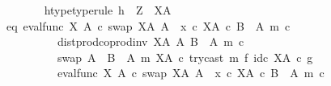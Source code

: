 \begin{isabellebody}
\ \ \ \ \ \ \isamarkupfalse%
\ h{\isacharunderscore}{\kern0pt}type{\isacharbrackleft}{\kern0pt}type{\isacharunderscore}{\kern0pt}rule{\isacharbrackright}{\kern0pt}{\isacharcolon}{\kern0pt}\ {\isachardoublequoteopen}h\ {\isacharcolon}{\kern0pt}\ Z\ {\isasymrightarrow}\ X\isactrlbsup A\isactrlesup {\isachardoublequoteclose}\isanewline
\ \ \ \ \ \ \isamarkupfalse%
\ eq{\isacharcolon}{\kern0pt}\ {\isachardoublequoteopen}{\isacharparenleft}{\kern0pt}{\isacharparenleft}{\kern0pt}eval{\isacharunderscore}{\kern0pt}func\ X\ A\ {\isasymcirc}\isactrlsub c\ swap\ {\isacharparenleft}{\kern0pt}X\isactrlbsup A\isactrlesup {\isacharparenright}{\kern0pt}\ A{\isacharparenright}{\kern0pt}\ {\isasymamalg}\ {\isacharparenleft}{\kern0pt}x\ {\isasymcirc}\isactrlsub c\ {\isasymbeta}\isactrlbsub X\isactrlbsup A\isactrlesup \ {\isasymtimes}\isactrlsub c\ {\isacharparenleft}{\kern0pt}B\ {\isasymsetminus}\ {\isacharparenleft}{\kern0pt}A{\isacharcomma}{\kern0pt}\ m{\isacharparenright}{\kern0pt}{\isacharparenright}{\kern0pt}\isactrlesub {\isacharparenright}{\kern0pt}\ {\isasymcirc}\isactrlsub c\isanewline
\ \ \ \ \ \ \ \ \ \ dist{\isacharunderscore}{\kern0pt}prod{\isacharunderscore}{\kern0pt}coprod{\isacharunderscore}{\kern0pt}inv\ {\isacharparenleft}{\kern0pt}X\isactrlbsup A\isactrlesup {\isacharparenright}{\kern0pt}\ A\ {\isacharparenleft}{\kern0pt}B\ {\isasymsetminus}\ {\isacharparenleft}{\kern0pt}A{\isacharcomma}{\kern0pt}\ m{\isacharparenright}{\kern0pt}{\isacharparenright}{\kern0pt}\ {\isasymcirc}\isactrlsub c\isanewline
\ \ \ \ \ \ \ \ \ \ swap\ {\isacharparenleft}{\kern0pt}A\ {\isasymCoprod}\ {\isacharparenleft}{\kern0pt}B\ {\isasymsetminus}\ {\isacharparenleft}{\kern0pt}A{\isacharcomma}{\kern0pt}\ m{\isacharparenright}{\kern0pt}{\isacharparenright}{\kern0pt}{\isacharparenright}{\kern0pt}\ {\isacharparenleft}{\kern0pt}X\isactrlbsup A\isactrlesup {\isacharparenright}{\kern0pt}\ {\isasymcirc}\isactrlsub c\ try{\isacharunderscore}{\kern0pt}cast\ m\ {\isasymtimes}\isactrlsub f\ id\isactrlsub c\ {\isacharparenleft}{\kern0pt}X\isactrlbsup A\isactrlesup {\isacharparenright}{\kern0pt}{\isacharparenright}{\kern0pt}\isactrlsup {\isasymsharp}\ {\isasymcirc}\isactrlsub c\ g\isanewline
\ \ \ \ \ \ \ \ {\isacharequal}{\kern0pt}\isanewline
\ \ \ \ \ \ \ \ \ \ {\isacharparenleft}{\kern0pt}{\isacharparenleft}{\kern0pt}eval{\isacharunderscore}{\kern0pt}func\ X\ A\ {\isasymcirc}\isactrlsub c\ swap\ {\isacharparenleft}{\kern0pt}X\isactrlbsup A\isactrlesup {\isacharparenright}{\kern0pt}\ A{\isacharparenright}{\kern0pt}\ {\isasymamalg}\ {\isacharparenleft}{\kern0pt}x\ {\isasymcirc}\isactrlsub c\ {\isasymbeta}\isactrlbsub X\isactrlbsup A\isactrlesup \ {\isasymtimes}\isactrlsub c\ {\isacharparenleft}{\kern0pt}B\ {\isasymsetminus}\ {\isacharparenleft}{\kern0pt}A{\isacharcomma}{\kern0pt}\ m{\isacharparenright}{\kern0pt}{\isacharparenright}{\kern0pt}\isactrlesub {\isacharparenright}{\kern0pt}\ {\isasymcirc}\isactrlsub c\isanewline

\end{isabellebody}
